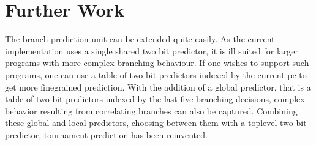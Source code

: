 \section{Further Work}

The branch prediction unit can be extended quite easily.
As the current implementation uses a single shared two bit predictor, it is ill suited for larger programs with more complex branching behaviour.
If one wishes to support such programs, one can use a table of two bit predictors indexed by the current pc to get more finegrained prediction.
With the addition of a global predictor, that is a table of two-bit predictors indexed by the last five branching decisions, complex behavior resulting from correlating branches can also be captured.
Combining these global and local predictors, choosing between them with a toplevel two bit predictor, tournament prediction has been reinvented.

